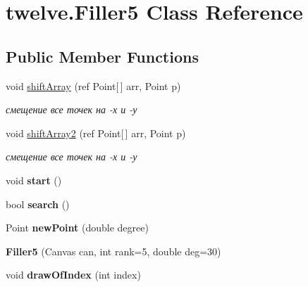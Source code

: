 \hypertarget{classtwelve_1_1_filler5}{}\section{twelve.\+Filler5 Class Reference}
\label{classtwelve_1_1_filler5}
\subsection*{Public Member Functions}
\begin{DoxyCompactItemize}
\item 
void \hyperlink{classtwelve_1_1_filler5_a05e5629690a63eec09ea71df3373a0c3}{shift\+Array} (ref Point\mbox{[}$\,$\mbox{]} arr, Point p)
\begin{DoxyCompactList}\small\item\em смещение все точек на -\/х и -\/у \end{DoxyCompactList}\item 
void \hyperlink{classtwelve_1_1_filler5_a0c70a6f5d57489a287b9f33e47cc110f}{shift\+Array2} (ref Point\mbox{[}$\,$\mbox{]} arr, Point p)
\begin{DoxyCompactList}\small\item\em смещение все точек на -\/х и -\/у \end{DoxyCompactList}\item 
\hypertarget{classtwelve_1_1_filler5_a8a967b46734cba6e74a0f0bf26734318}{}void {\bfseries start} ()\label{classtwelve_1_1_filler5_a8a967b46734cba6e74a0f0bf26734318}

\item 
\hypertarget{classtwelve_1_1_filler5_ad719bd5b70ec6697c71823a5e3fcd102}{}bool {\bfseries search} ()\label{classtwelve_1_1_filler5_ad719bd5b70ec6697c71823a5e3fcd102}

\item 
\hypertarget{classtwelve_1_1_filler5_ad7e4993138b35a7188160c97a62767ea}{}Point {\bfseries new\+Point} (double degree)\label{classtwelve_1_1_filler5_ad7e4993138b35a7188160c97a62767ea}

\item 
\hypertarget{classtwelve_1_1_filler5_ab20c7d27b839ac157f19b38b769d883a}{}{\bfseries Filler5} (Canvas can, int rank=5, double deg=30)\label{classtwelve_1_1_filler5_ab20c7d27b839ac157f19b38b769d883a}

\item 
\hypertarget{classtwelve_1_1_filler5_ac358653a36f3c87a247576f76f3ed776}{}void {\bfseries draw\+Of\+Index} (int index)\label{classtwelve_1_1_filler5_ac358653a36f3c87a247576f76f3ed776}


\end{DoxyCompactItemize}

